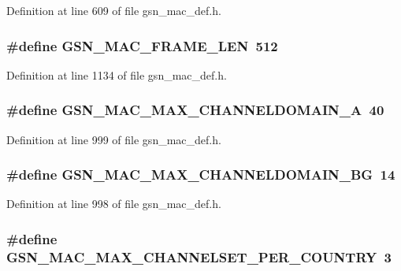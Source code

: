 Definition at line 609 of file gsn\_\-mac\_\-def.h.

\hypertarget{a00522_a71317c8ae3896c4b366852492dd940c7}{
\subsubsection[{GSN\_\-MAC\_\-FRAME\_\-LEN}]{\setlength{\rightskip}{0pt plus 5cm}\#define GSN\_\-MAC\_\-FRAME\_\-LEN~512}}
\label{a00522_a71317c8ae3896c4b366852492dd940c7}


Definition at line 1134 of file gsn\_\-mac\_\-def.h.

\hypertarget{a00522_a0190b853ff7163a58d61d96c57abff6c}{
\subsubsection[{GSN\_\-MAC\_\-MAX\_\-CHANNELDOMAIN\_\-A}]{\setlength{\rightskip}{0pt plus 5cm}\#define GSN\_\-MAC\_\-MAX\_\-CHANNELDOMAIN\_\-A~40}}
\label{a00522_a0190b853ff7163a58d61d96c57abff6c}


Definition at line 999 of file gsn\_\-mac\_\-def.h.

\hypertarget{a00522_a69dd34609ffc0b471bbd3eaa1586ad4b}{
\subsubsection[{GSN\_\-MAC\_\-MAX\_\-CHANNELDOMAIN\_\-BG}]{\setlength{\rightskip}{0pt plus 5cm}\#define GSN\_\-MAC\_\-MAX\_\-CHANNELDOMAIN\_\-BG~14}}
\label{a00522_a69dd34609ffc0b471bbd3eaa1586ad4b}


Definition at line 998 of file gsn\_\-mac\_\-def.h.

\hypertarget{a00522_a29265c71de05016a9a4cb2e5f57e450d}{
\subsubsection[{GSN\_\-MAC\_\-MAX\_\-CHANNELSET\_\-PER\_\-COUNTRY}]{\setlength{\rightskip}{0pt plus 5cm}\#define GSN\_\-MAC\_\-MAX\_\-CHANNELSET\_\-PER\_\-COUNTRY~3}}
\label{a00522_a29265c71de05016a9a4cb2e5f57e450d}


